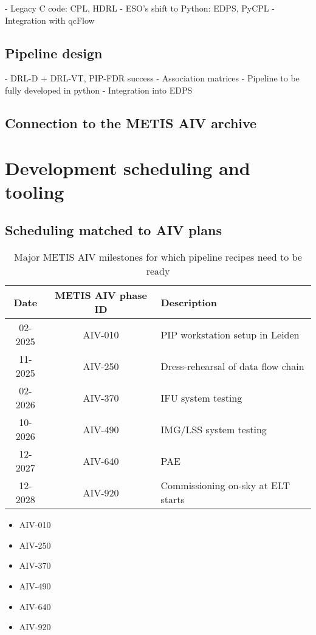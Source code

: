 \documentclass[]{spie}  %
\begin{document}
	- Legacy C code: CPL, HDRL
	- ESO's shift to Python: EDPS, PyCPL
	- Integration with qcFlow

\subsection{Pipeline design}
\label{ssec:imp_pip}

	- DRL-D + DRL-VT, PIP-FDR success
	- Association matrices
	- Pipeline to be fully developed in python 
	- Integration into EDPS
 
\subsection{Connection to the METIS AIV archive}
\label{ssec:imp_archive}


\section{Development scheduling and tooling}
\label{sec:development}

\subsection{Scheduling matched to AIV plans}
\label{ssec:dev_aiv}

\begin{table}[]
    \centering
\caption{Major METIS AIV milestones for which pipeline recipes need to be ready}
\label{tab:dev_aiv_milestones}
    \begin{tabular}{c|c|l}
    \hline
    \hline
         Date &   METIS AIV phase ID & Description\\
         \hline
         02-2025 &   AIV-010&PIP workstation setup in Leiden\\
         11-2025 &   AIV-250&Dress-rehearsal of data flow chain\\
 02-2026 & AIV-370&IFU system testing\\
 10-2026 &  AIV-490&IMG/LSS system testing\\
 12-2027 & AIV-640&PAE\\
 12-2028 & AIV-920&Commissioning on-sky at ELT starts\\
 \hline
 \end{tabular}
      
\end{table}

\begin{itemize}
    \item AIV-010
    \item AIV-250
    \item AIV-370
    \item AIV-490
    \item AIV-640
    \item AIV-920
\end{itemize}
\end{document}
